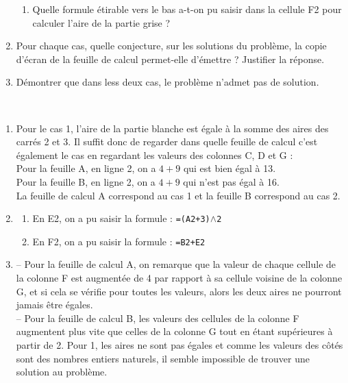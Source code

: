 \begin{exercice}[CRPE 2019 G1]
\begin{enumerate}
\begin{enumerate}
            \item Quelle formule étirable vers le bas a-t-on pu saisir dans la cellule F2 pour calculer l’aire de la partie grise ?
         \end{enumerate}
      \item Pour chaque cas, quelle conjecture, sur les solutions du problème, la copie d’écran de la feuille de calcul permet-elle d’émettre ? Justifier la réponse.
      \item Démontrer que dans less deux cas, le problème n’admet pas de solution.
   \end{enumerate}
\end{exercice}

\begin{corrige}
\ \\ [-5mm]
   \begin{enumerate}
      \item Pour le cas 1, l'aire de la partie blanche est égale à la somme des aires des carrés 2 et 3. Il suffit donc de regarder dans quelle feuille de calcul c'est également le cas en regardant les valeurs des colonnes C, D et G : \\
         Pour la feuille A, en ligne 2, on a $4 + 9$ qui est bien égal à 13. \\
         Pour la feuille B, en ligne 2, on a $4 + 9$ qui n'est pas égal à 16. \\
        {\blue La feuille de calcul A correspond au cas 1 et la feuille B correspond au cas 2}.
      \item
         \begin{enumerate}
            \item En E2, on a pu saisir la formule : {\blue \texttt{=(A2+3)$\wedge$2}}
            \item En F2, on a pu saisir la formule : {\blue \texttt{=B2+E2}}
         \end{enumerate}
      \setcounter{enumi}{2}
      \item -- Pour la feuille de calcul A, on remarque que la valeur de chaque cellule de la colonne F est augmentée de 4 par rapport à sa cellule voisine de la colonne G, et si cela se vérifie pour toutes les valeurs, alors les deux aires ne pourront jamais être égales. \\
         -- Pour la feuille de calcul B, les valeurs des cellules de la colonne F augmentent plus vite que celles de la colonne G tout en étant supérieures à partir de 2. Pour 1, les aires ne sont pas égales et comme les valeurs des côtés sont des nombres entiers naturels, il semble impossible de trouver une solution au problème. \\

\end{enumerate}
\end{corrige}
